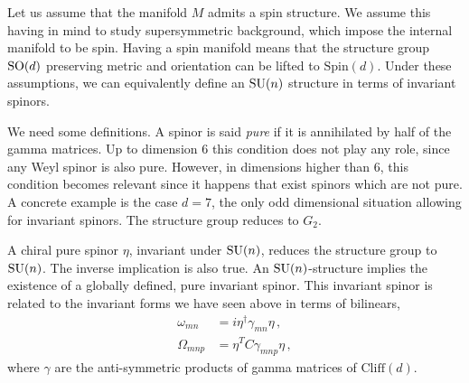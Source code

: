 \documentclass[debug]{phd}
\begin{document}
						Let us assume that the manifold $M$ admits a spin structure. 
						We assume this having in mind to study supersymmetric background, which impose the internal manifold to be spin.
						Having a spin manifold means that the structure group $\mathrm{SO}(d)$ preserving metric and orientation can be lifted to $\mathrm{Spin}(d)$.
						Under these assumptions, we can equivalently define an $\mathrm{SU}(n)$ structure in terms of invariant spinors.
						
						We need some definitions.
						A spinor is said \emph{pure} if it is annihilated by half of the gamma matrices. Up to dimension $6$ this condition does not play any role, since any Weyl spinor is also pure. 
						However, in dimensions higher than $6$, this condition becomes relevant since it happens that exist spinors which are not pure.
						A concrete example is the case $d=7$, the only odd dimensional situation allowing for invariant spinors.
						The structure group reduces to $G_2$.
						
						A chiral pure spinor $\eta$, invariant under $\mathrm{SU}(n)$, reduces the structure group to $\mathrm{SU}(n)$.
						The inverse implication is also true.
						An $\mathrm{SU}(n)$-structure implies the existence of a globally defined, pure invariant spinor.
						This invariant spinor is related to the invariant forms we have seen above in terms of bilinears,
								\begin{equation}\label{spinorSUn}
									\begin{split}
										\omega_{mn} &= i \eta^\dagger \gamma_{mn} \eta\, , \\
										\Omega_{mnp} &= \eta^T C \gamma_{mnp} \eta\, ,
									\end{split}
								\end{equation}
						where $\gamma$ are the anti-symmetric products of gamma matrices of $\mathrm{Cliff}(d)$. 						%
\end{document}
